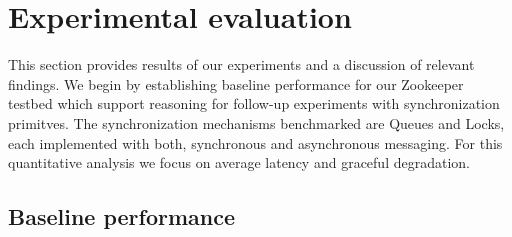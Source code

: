 \section{Experimental evaluation}\label{sec:eval}
This section provides results of our experiments and a discussion of relevant findings. We begin by establishing baseline performance for our Zookeeper testbed which support reasoning for follow-up experiments with synchronization primitves. The synchronization mechanisms benchmarked are Queues and Locks, each implemented with both, synchronous and asynchronous messaging. For this quantitative analysis we focus on average latency and graceful degradation.




\subsection{Baseline performance}

